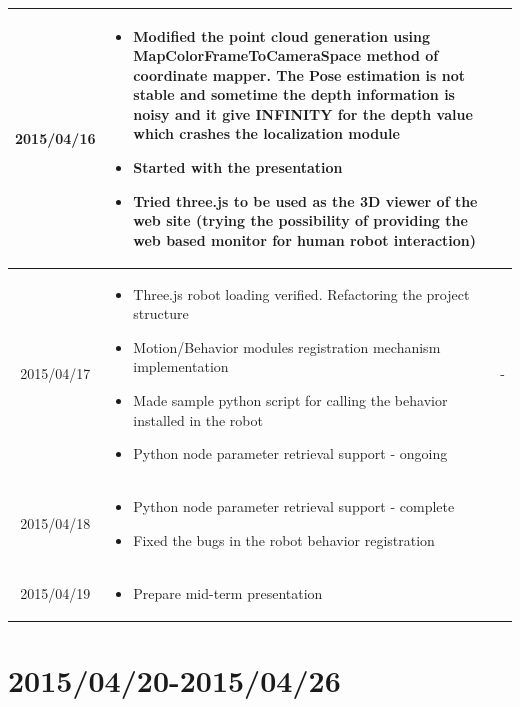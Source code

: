 \documentclass[11pt]{article} %
\begin{document}
\begin{center}
\begin{longtable}{ | c | p{6cm} | p{5cm} |}
  2015/04/16         & 
  \begin{itemize}
  \item Modified the point cloud generation using MapColorFrameToCameraSpace method of coordinate mapper. The Pose estimation is not stable and sometime the depth information is noisy and it give INFINITY for the depth value which crashes the localization module
  \item Started with the presentation
  \item Tried three.js to be used as the 3D viewer of the web site (trying the possibility of providing the web based monitor for human robot interaction)
\end{itemize}   
  & 
\\  										 \hline

  2015/04/17         & 
  \begin{itemize}
  \item Three.js robot loading verified. Refactoring the project structure
  \item Motion/Behavior modules registration mechanism implementation
  \item Made sample python script for calling the behavior installed in the robot
  \item Python node parameter retrieval support - ongoing
\end{itemize}   
  & 
  - 
\\
  										 \hline
  										 
	 2015/04/18         & 
  \begin{itemize}
  \item Python node parameter retrieval support - complete
  \item Fixed the bugs in the robot behavior registration
\end{itemize}   
  & 
		\\					 \hline  	

	 2015/04/19         & 
  \begin{itemize}
  \item Prepare mid-term presentation
\end{itemize}   
  & 
		\\					 \hline  	
										 
  										   								 
    \end{longtable}
\end{center}


\newpage
\section{2015/04/20-2015/04/26}
\end{document}
